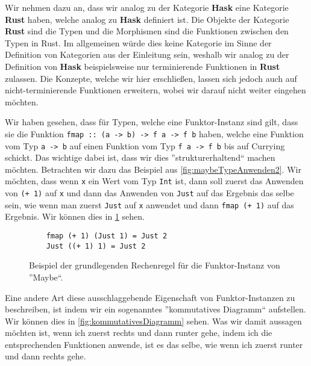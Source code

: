 \documentclass{hhuarticle}
\theoremstyle{definition}
\theoremstyle{theorem}
\begin{document}
  Wir nehmen dazu an, dass wir analog zu der Kategorie \textbf{Hask}
  eine Kategorie \textbf{Rust} haben, welche analog zu \textbf{Hask}
  definiert ist. Die Objekte der Kategorie \textbf{Rust} sind die
  Typen und die Morphismen sind die Funktionen zwischen den Typen in
  Rust. Im allgemeinen würde dies keine Kategorie im Sinne der Definition
  von Kategorien aus der Einleitung sein, weshalb wir analog zu der
  Definition von \textbf{Hask} beispielsweise nur terminierende Funktionen
  in \textbf{Rust} zulassen. Die Konzepte, welche wir hier erschließen,
  lassen sich jedoch auch auf nicht-terminierende Funktionen erweitern,
  wobei wir darauf nicht weiter eingehen möchten.

  Wir haben gesehen, dass für Typen, welche eine Funktor-Instanz sind
  gilt, dass sie die Funktion \verb|fmap :: (a -> b) -> f a -> f b| haben,
  welche eine Funktion vom Typ \verb|a -> b| auf einen Funktion vom Typ
  \verb|f a -> f b| bis auf Currying schickt. Das wichtige dabei ist,
  dass wir dies ''strukturerhaltend`` machen möchten. Betrachten wir
  dazu das Beispiel aus \cref{fig:maybeTypeAnwenden2}. Wir möchten,
  dass wenn \verb|x| ein Wert vom Typ \verb|Int| ist, dann soll
  zuerst das Anwenden von \verb|(+ 1)| auf \verb|x| und dann das
  Anwenden von \verb|Just| auf das Ergebnis das selbe sein, wie wenn
  man zuerst \verb|Just| auf \verb|x| anwendet und dann \verb|fmap (+ 1)|
  auf das Ergebnis. Wir können dies in \cref{fig:kommutativitaetFunktor}
  sehen.

  \begin{figure}[h]

    \begin{verbatim}
    fmap (+ 1) (Just 1) = Just 2
    Just ((+ 1) 1) = Just 2
    \end{verbatim}
    \caption{Beispiel der grundlegenden Rechenregel für die Funktor-Instanz von ''Maybe``.}%
    \label{fig:kommutativitaetFunktor}
  \end{figure}

  Eine andere Art diese ausschlaggebende Eigenschaft von Funktor-Instanzen
  zu beschreiben, ist indem wir ein sogenanntes ''kommutatives Diagramm``
  aufstellen. Wir können dies in \cref{fig:kommutativesDiagramm} sehen.
  Was wir damit aussagen möchten ist, wenn ich zuerst rechts und dann runter
  gehe, indem ich die entsprechenden Funktionen anwende, ist es das selbe,
  wie wenn ich zuerst runter und dann rechts gehe.
\end{document}
